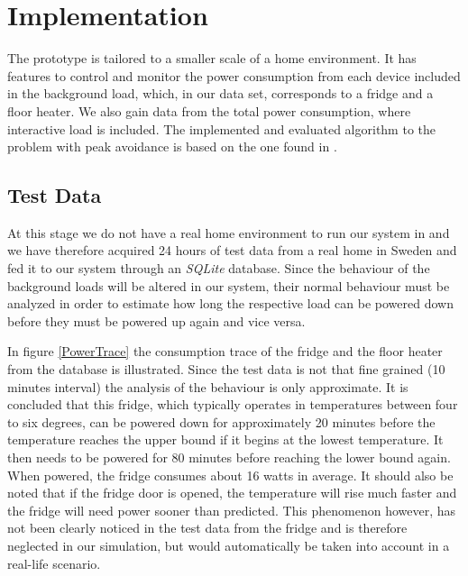 \section{Implementation}
\label{sec:implementation}
The prototype is tailored to a smaller scale of a home environment. It has features to control and monitor the power consumption from each device included in the background load, which, in our data set, corresponds to a fridge and a floor heater. We also gain data from the total power consumption, where interactive load is included. The implemented and evaluated algorithm to the problem with peak avoidance is based on the one found in \cite{barker2012smartcap}.

\subsection{Test Data}
At this stage we do not have a real home environment to run our system in and we have therefore acquired 24 hours of test data from a real home in Sweden and fed it to our system through an \emph{SQLite} database. Since the behaviour of the background loads will be altered in our system, their normal behaviour must be analyzed in order to estimate how long the respective load can be powered down before they must be powered up again and vice versa. 

In figure \ref{PowerTrace} the consumption trace of the fridge and the floor heater from the database is illustrated. Since the test data is not that fine grained (10 minutes interval) the analysis of the behaviour is only approximate. It is concluded that this fridge, which typically operates in temperatures between four to six degrees, can be powered down for approximately 20 minutes before the temperature reaches the upper bound if it begins at the lowest temperature. It then needs to be powered for 80 minutes before reaching the lower bound again. When powered, the fridge consumes about 16 watts in average. It should also be noted that if the fridge door is opened, the temperature will rise much faster and the fridge will need power sooner than predicted. This phenomenon however, has not been clearly noticed in the test data from the fridge and is therefore neglected in our simulation, but would automatically be taken into account in a real-life scenario.

